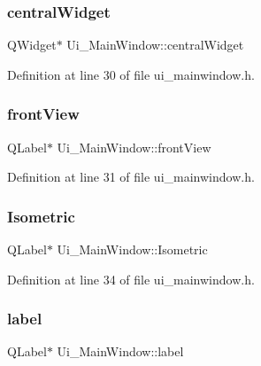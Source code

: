 \subsubsection{\texorpdfstring{central\+Widget}{centralWidget}}
{\footnotesize\ttfamily Q\+Widget$\ast$ Ui\+\_\+\+Main\+Window\+::central\+Widget}



Definition at line 30 of file ui\+\_\+mainwindow.\+h.

\mbox{\label{class_ui___main_window_aaa3be6280852dd7414487d8eb8721875}} 
\subsubsection{\texorpdfstring{front\+View}{frontView}}
{\footnotesize\ttfamily Q\+Label$\ast$ Ui\+\_\+\+Main\+Window\+::front\+View}



Definition at line 31 of file ui\+\_\+mainwindow.\+h.

\mbox{\label{class_ui___main_window_a337da439425ad2b604103c6d32532012}} 
\subsubsection{\texorpdfstring{Isometric}{Isometric}}
{\footnotesize\ttfamily Q\+Label$\ast$ Ui\+\_\+\+Main\+Window\+::\+Isometric}



Definition at line 34 of file ui\+\_\+mainwindow.\+h.

\mbox{\label{class_ui___main_window_ad9c89133780f28e6efa2ec17ceb9cff5}} 
\subsubsection{\texorpdfstring{label}{label}}
{\footnotesize\ttfamily Q\+Label$\ast$ Ui\+\_\+\+Main\+Window\+::label}



